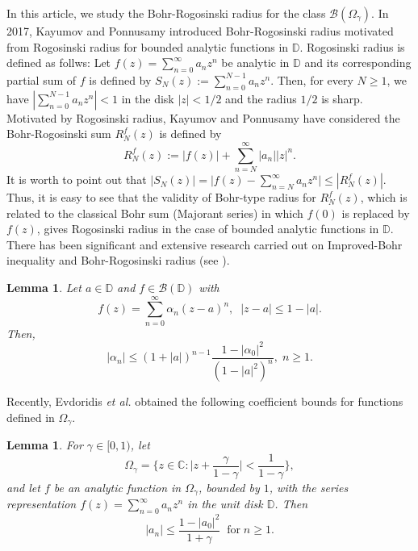 \documentclass[a4paper,12pt]{amsart}
\theoremstyle{plain}
\newtheorem{lem}[equation]{Lemma}
\theoremstyle{definition}
\begin{document}
 In this article, we study the Bohr-Rogosinski radius for the class $\mathcal{B}(\Omega_{\gamma})$. In 2017, Kayumov and Ponnusamy \cite{kayumov-2017} introduced Bohr-Rogosinski radius motivated from Rogosinski radius for bounded analytic functions in $\mathbb{D}$. Rogosinski radius is defined as follws: Let $f(z)=\sum_{n=0}^{\infty} a_{n}z^{n}$ be analytic in $\mathbb{D}$ and its corresponding partial sum of $f$ is defined by $S_{N}(z):=\sum_{n=0}^{N-1} a_{n}z^{n}$. Then, for every $N \geq 1$, we have $|\sum_{n=0}^{N-1} a_{n}z^{n}|<1$ in the disk $|z|<1/2$ and the radius $1/2$ is sharp. Motivated by Rogosinski radius, Kayumov and Ponnusamy have considered the Bohr-Rogosinski sum $R_{N}^{f}(z)$ is defined by 
 \begin{equation}
 R_{N}^{f}(z):=|f(z)|+ \sum_{n=N}^{\infty} |a_{n}||z|^{n}.
 \end{equation}
 It is worth to point out that $|S_{N}(z)|=\big|f(z)-\sum_{n=N}^{\infty} a_{n}z^{n}\big| \leq |R_{N}^{f}(z)|$. Thus, it is easy to see that the validity of Bohr-type radius for $R_{N}^{f}(z)$, which is related to the classical Bohr sum (Majorant series) in which $f(0)$ is replaced by $f(z)$, gives Rogosinski radius in the case of bounded analytic functions in $\mathbb{D}$. There has been significant and extensive research carried out on Improved-Bohr inequality and Bohr-Rogosinski radius (see \cite{Alkhaleefah-Kayumov-Ponnusamy-2020,Huang-Liu-Ponnu-2020,Ismagilov-2020,kayumov-2017,kayumov-2018-b,Kay & Pon & AASFM & 2019,kayumov-2018-c,kay & Pon & Sha & MN & 2018,Liu-2020,Ponnusamy-Wirths-2020}).
 \begin{lem}\cite{Ruscheweyh-1985}\label{lem-1.4}
 	Let $ a\in\mathbb{D} $ and $ f\in\mathcal{B}(\mathbb{D}) $ with \begin{equation*}
 	f(z)=\sum_{n=0}^{\infty}\alpha_n(z-a)^n,\;\; |z-a|\leq 1-|a|.
 	\end{equation*}
 	Then, 
 	\begin{equation*}
 	|\alpha_n|\leq (1+|a|)^{n-1}\frac{1-|\alpha_0|^2}{(1-|a|^2)^n},\; n\geq 1.
 	\end{equation*}
 \end{lem}
\noindent Recently, Evdoridis \textit{et al.} \cite{Evd-Ponn-Rasi-2020} obtained the following coefficient bounds for functions defined in $ \Omega_{\gamma} $.
\begin{lem}\cite{Evd-Ponn-Rasi-2020}\label{lem-2.11}
	For $ \gamma\in [0,1) $, let \begin{equation*}
		\Omega_{\gamma}=\bigg\{z\in\mathbb{C} : \bigg|z+\frac{\gamma}{1-\gamma}\bigg|<\frac{1}{1-\gamma}\bigg\},
	\end{equation*}
	and let $ f $ be an analytic function in $ \Omega_{\gamma} $, bounded by $ 1 $, with the series representation $ f(z)=\sum_{n=0}^{\infty}a_nz^n $ in the unit disk $ \mathbb{D} $. Then 
	\begin{equation*}
		|a_n|\leq\frac{1-|a_0|^2}{1+\gamma}\;\; \text{for}\; n\geq 1.
	\end{equation*}
\end{lem}
\end{document}
